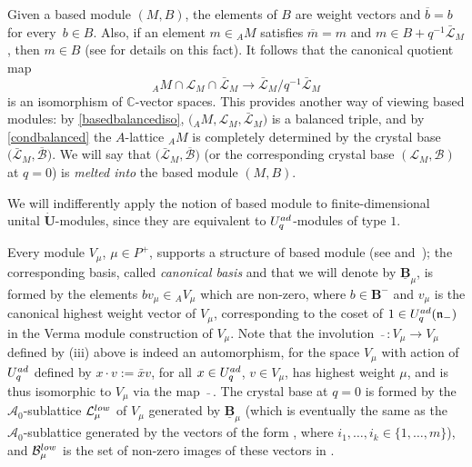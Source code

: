 \documentclass[11pt]{article}
\numberwithin{equation}{section}
\numberwithin{equation}{section}
\theoremstyle{definition}
\newcommand{\mc}{\mathbb{C}}
\newcommand{\Ll}{{\mathcal L}}
\newcommand{\ra}{\rightarrow}
\begin{document}
Given a based module $(M,B)$, the elements of $B$ are weight vectors and $\overline{b}=b$ for every~${b\in B}$. Also, if an element $m\in {}_A M$ satisfies $\overline{m}=m$ and $m\in B + q^{-1}\bar{\Ll}_M$, then $m\in B$ (see \cite[Section~27.1.5]{Lusztig} for details on this fact). It follows that the canonical quotient map
\begin{equation}\label{basedbalancediso} {}_A M \cap \Ll_M \cap \bar{\Ll}_M \ra \bar{\Ll}_M/q^{-1}\bar{\Ll}_M
\end{equation}
is an isomorphism of $\mc$-vector spaces. This provides another way of viewing based modules: by \eqref{basedbalancediso}, $\big({}_A M, \Ll_M,\bar{\Ll}_M\big)$ is a balanced triple, and by \eqref{condbalanced} the $A$-lattice ${}_A M$ is completely determined by the crystal base $\big(\bar{\Ll}_M,\overline{\mathcal{B}}\big)$. We will say that $\big(\bar{\Ll}_M,\overline{\mathcal{B}}\big)$ (or the corresponding crystal base $(\Ll_M,\mathcal{B})$ at $q=0$) is {\it melted into} the based module $(M,B)$.

We will indifferently apply the notion of based module to finite-dimensional unital $\dot{\mathbf{U}}$-modules, since they are equivalent to $U_q^{\rm ad}$-modules of type $1$.


Every module $V_\mu$, $\mu\in P^+$, supports a structure of based module (see \cite[Section~14.4.10]{Lusztig} and~\cite{Kashiwara1}); the corresponding basis, called {\it canonical basis} and that we will denote by $\underline{\mathbf{B}}_{\mu}$, is formed by the elements $bv_{\mu}\in {}_AV_\mu$ which are non-zero, where $b\in \mathbf{B}^-$ and $v_{\mu}$ is the canonical highest weight vector of $V_{\mu}$, corresponding to the coset of $1\in U_q^{\rm ad}(\mathfrak{n}_-)$ in the Verma module construction of $V_{\mu}$. Note that the involution $\ \bar{}\ \colon V_{\mu}\ra V_{\mu}$ defined by (iii) above is indeed an automorphism, for the space $V_\mu$ with action of $U_q^{\rm ad}$ defined by $x\cdot v := \bar{x}v$, for all $x\in U_q^{\rm ad}$, $v\in V_\mu$, has highest weight $\mu$, and is thus isomorphic to $V_\mu$ via the map $\ \bar{}\ $. The crystal base \smash{$\big(\Ll_\mu^{\rm low},\mathcal{B}_\mu^{\rm low}\big)$} at $q=0$ is formed by the $\mathcal{A}_0$-sublattice $\Ll_\mu^{\rm low}$ of $V_{\mu}$ generated by $\underline{\mathbf{B}}_{\mu}$ (which is eventually the same as the $\mathcal{A}_0$-sublattice generated by the vectors of the form , where $i_1,\dots ,i_k \in \{1,\dots,m\}$), and $\mathcal{B}_\mu^{\rm low}$ is the set of non-zero images of these vectors in \smash{$\Ll_\mu^{\rm low}/q\Ll_\mu^{\rm low}$}.
\end{document}
